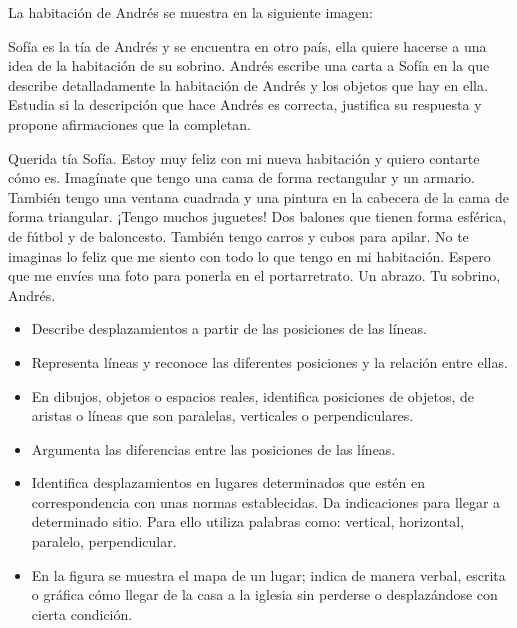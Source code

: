 La habitación de Andrés se muestra en la siguiente imagen:


Sofía es la tía de Andrés y se encuentra en otro país, ella quiere hacerse a una idea de la habitación de su sobrino. Andrés escribe una carta a Sofía en la que describe detalladamente la habitación de Andrés y los objetos que hay en ella. Estudia si la descripción que hace Andrés es correcta, justifica su respuesta y propone afirmaciones que la completan.

Querida tía Sofía. Estoy muy feliz con mi nueva habitación y quiero contarte cómo es. Imagínate que tengo una cama de forma rectangular y un armario. También tengo una ventana cuadrada y una pintura en la cabecera de la cama de forma triangular. ¡Tengo muchos juguetes! Dos balones que tienen forma esférica, de fútbol y de baloncesto. También tengo carros y cubos para apilar. No te imaginas lo feliz que me siento con todo lo que tengo en mi habitación. Espero que me envíes una foto para ponerla en el portarretrato. Un abrazo. Tu sobrino, Andrés.


\evidencias

\begin{itemize}
  \item Describe desplazamientos a partir de las posiciones de las líneas.
  \item Representa líneas y reconoce las diferentes posiciones y la relación entre ellas.
  \item En dibujos, objetos o espacios reales, identifica posiciones de objetos, de aristas o líneas que son paralelas, verticales o perpendiculares.
  \item Argumenta las diferencias entre las posiciones de las líneas.
\end{itemize}

\ejemplo

\begin{itemize}
  \item Identifica desplazamientos en lugares determinados que estén en correspondencia con unas normas establecidas. Da indicaciones para llegar a determinado sitio. Para ello utiliza palabras como: vertical, horizontal, paralelo, perpendicular.
  \item En la figura se muestra el mapa de un lugar; indica de manera verbal, escrita o gráfica cómo llegar de la casa a la iglesia sin perderse o desplazándose con cierta condición.
\end{itemize}

